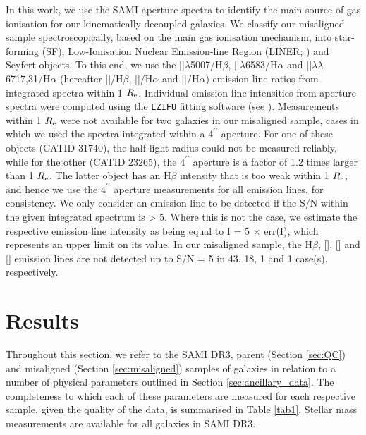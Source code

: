 \documentclass[fleqn,usenatbib]{mnras}
\begin{document}
In this work, we use the SAMI aperture spectra to identify the main source of gas ionisation for our kinematically decoupled galaxies. We  classify our misaligned sample spectroscopically, based on the main gas ionisation mechanism, into star-forming (SF), Low-Ionisation Nuclear Emission-line Region (LINER; \citealt{Heckman1980}) and Seyfert objects. To this end, we use the  []$\lambda$5007/H$\beta$, []$\lambda$6583/H$\alpha$ and []$\lambda \lambda$6717,31/H$\alpha$ (hereafter []/H$\beta$, []/H$\alpha$ and []/H$\alpha$) emission line ratios from integrated spectra within 1 $R_{\rm{e}}$. Individual emission line intensities from aperture spectra were computed using the \texttt{LZIFU} fitting software (see \citealt{Ho2016}). Measurements within 1 $R_{\rm{e}}$ were not available for two galaxies in our misaligned sample, cases in which we used the spectra integrated within a $4^{\prime\prime}$ aperture. For one of these objects (CATID 31740), the half-light radius could not be measured reliably, while for the other (CATID 23265), the $4^{\prime\prime}$ aperture is a factor of 1.2 times
larger than 1 $R_{\rm{e}}$. The latter object has an H$\beta$ intensity that is too weak within 1 $R_{\rm{e}}$, and hence we use the $4^{\prime\prime}$ aperture measurements for all emission lines, for consistency. We only consider an emission line to be detected if the S/N within the given integrated spectrum is > 5. Where this is not the case, we estimate the respective emission line intensity as being equal to I = 5 $\times$ err(I), which represents an upper limit on its value. In our misaligned sample, the H$\beta$, [], [] and [] emission lines are not detected up to S/N = 5 in 43, 18, 1 and 1 case(s), respectively.

\section{Results}

Throughout this section, we refer to the SAMI DR3, parent (Section \ref{sec:QC}) and misaligned (Section \ref{sec:misaligned}) samples of galaxies in relation to a number of physical parameters outlined in Section \ref{sec:ancillary_data}. The completeness to which each of these parameters are measured for each respective sample, given the quality of the data, is summarised in Table \ref{tab1}. Stellar mass measurements are available for all galaxies in SAMI DR3. 
\end{document}

